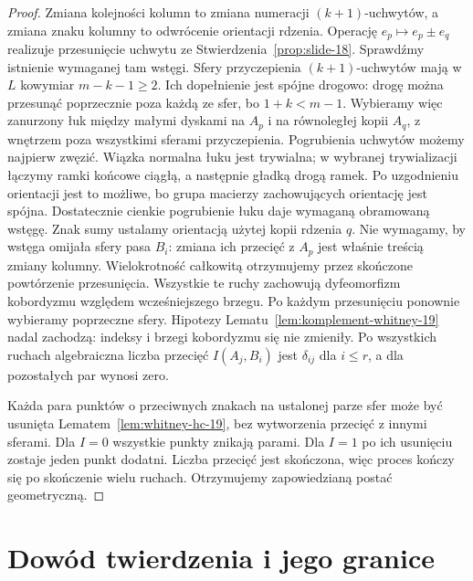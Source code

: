 \begin{proof}
Zmiana kolejności kolumn
to zmiana numeracji
$(k+1)$-uchwytów,
a zmiana znaku kolumny
to odwrócenie orientacji
rdzenia. Operację
$e_p\mapsto e_p\pm e_q$
realizuje przesunięcie uchwytu ze
Stwierdzenia~\ref{prop:slide-18}.
Sprawdźmy istnienie wymaganej tam wstęgi. Sfery przyczepienia
$(k+1)$-uchwytów mają w $L$ kowymiar $m-k-1\geq2$.
Ich dopełnienie jest spójne drogowo: drogę można przesunąć
poprzecznie poza każdą ze sfer, bo $1+k<m-1$.
Wybieramy więc zanurzony łuk między małymi dyskami na $A_p$
i na równoległej kopii $A_q$, z wnętrzem poza wszystkimi sferami
przyczepienia. Pogrubienia uchwytów możemy najpierw zwęzić.
Wiązka normalna łuku jest trywialna; w wybranej trywializacji
łączymy ramki końcowe ciągłą, a następnie gładką drogą ramek.
Po uzgodnieniu orientacji jest to możliwe, bo grupa macierzy
zachowujących orientację jest spójna. Dostatecznie cienkie
pogrubienie łuku daje wymaganą obramowaną wstęgę.
Znak sumy ustalamy orientacją użytej kopii rdzenia $q$.
Nie wymagamy, by wstęga omijała sfery pasa $B_i$:
zmiana ich przecięć z $A_p$ jest właśnie treścią zmiany kolumny.
Wielokrotność całkowitą
otrzymujemy przez
skończone powtórzenie
przesunięcia.
Wszystkie te ruchy
zachowują dyfeomorfizm
kobordyzmu względem
wcześniejszego brzegu.
Po każdym przesunięciu ponownie wybieramy poprzeczne sfery.
Hipotezy Lematu~\ref{lem:komplement-whitney-19} nadal zachodzą:
indeksy i brzegi kobordyzmu się nie zmieniły.
Po wszystkich ruchach algebraiczna
liczba przecięć
$I(A_j,B_i)$ jest
$\delta_{ij}$ dla $i\leq r$,
a dla pozostałych par
wynosi zero.

Każda para punktów
o przeciwnych znakach
na ustalonej parze sfer
może być usunięta
Lematem~\ref{lem:whitney-hc-19},
bez wytworzenia przecięć
z innymi sferami.
Dla $I=0$ wszystkie
punkty znikają parami.
Dla $I=1$ po ich
usunięciu zostaje
jeden punkt dodatni.
Liczba przecięć jest
skończona, więc
proces kończy się
po skończenie wielu
ruchach. Otrzymujemy
zapowiedzianą postać
geometryczną.
\end{proof}

\section{Dowód twierdzenia i jego granice}
\label{sec:dowod-smale-19}

